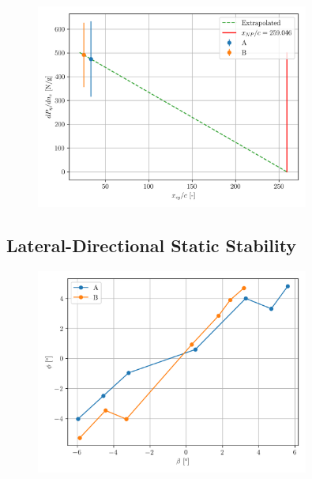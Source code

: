 \documentclass{article}
\begin{document}
\begin{figure}[H]
    \centering
    \includegraphics[width=0.8\textwidth]{Manoeuvre_Stability_4.png}
    \caption{}
    \label{fig:Manoeuvre_Stability_4}
\end{figure}

\subsection{Lateral-Directional Static Stability}

\begin{figure}[H]
    \centering
    \includegraphics[width=0.8\textwidth]{Lat_Directional_Static_Stability_SHSS_1.png}
    \caption{}
    \label{fig:Lat_Directional_Static_Stability_SHSS_1}
\end{figure}
\end{document}
